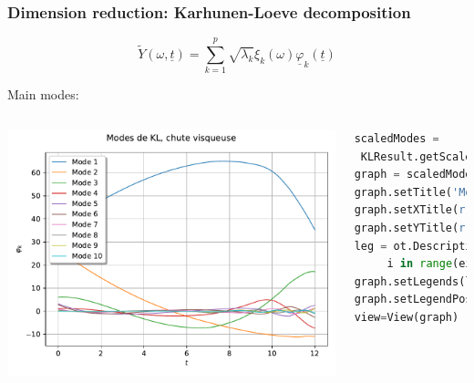 \documentclass[aspectratio=169]{beamer}
\begin{document}

\begin{frame}[containsverbatim]
\frametitle{Dimension reduction: Karhunen-Loeve decomposition}

\scriptsize 

\begin{equation*}
\tilde{Y}(\omega, \underline{t}) =  \sum_{k=1}^{p} \sqrt{\lambda_k} \xi_k(\omega)\underline{\varphi}_k(\underline{t})
\end{equation*}

Main modes:

\begin{columns}

    \includegraphics[width=1.\textwidth]{figures/Modes.pdf}
    
        
\tiny
\begin{lstlisting}[language=Python, numbers = none]
scaledModes =
 KLResult.getScaledModesAsProcessSample()
graph = scaledModes.drawMarginal(0)
graph.setTitle('Modes de KL, chute visqueuse')
graph.setXTitle(r'$t$')
graph.setYTitle(r'$\varphi_k$')
leg = ot.Description([ 'Mode '+str(i +1) for
	 i in range(eigenValues.getDimension()) ])
graph.setLegends(leg)
graph.setLegendPosition('topleft')
view=View(graph)
\end{lstlisting}

\end{columns}


\end{frame}
\end{document}
